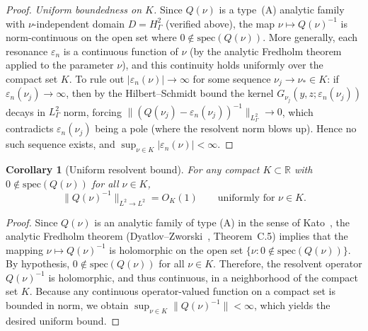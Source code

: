 \documentclass[12pt,a4paper]{amsart}
\newtheorem{corollary}[theorem]{Corollary}
\theoremstyle{remark}
\begin{document}
\begin{proof}
\emph{Uniform boundedness on $K$.}
Since $Q(\nu)$ is a type~(A) analytic family with $\nu$-independent domain
$D = H^2_\Gamma$ (verified above), the map
$\nu \mapsto Q(\nu)^{-1}$ is norm-continuous on the open set where
$0 \notin \mathrm{spec}(Q(\nu))$.
More generally, each resonance $\varepsilon_n$ is a continuous function
of $\nu$ (by the analytic Fredholm theorem applied to the parameter $\nu$),
and this continuity holds uniformly over the compact set $K$.
To rule out $|\varepsilon_n(\nu)| \to \infty$ for some sequence $\nu_j \to \nu_* \in K$:
if $\varepsilon_n(\nu_j) \to \infty$, then by the Hilbert--Schmidt bound the kernel
$G_{\nu_j}(y,z;\varepsilon_n(\nu_j))$ decays in $L^2_\Gamma$ norm,
forcing $\|(Q(\nu_j)-\varepsilon_n(\nu_j))^{-1}\|_{L^2_\Gamma} \to 0$,
which contradicts $\varepsilon_n(\nu_j)$ being a pole (where the resolvent norm blows up).
Hence no such sequence exists, and $\sup_{\nu\in K}|\varepsilon_n(\nu)| < \infty$.
\end{proof}

\begin{corollary}[Uniform resolvent bound]
\label{cor:Qnu_resolvent}
For any compact $K \subset \mathbb{R}$ with $0 \notin \mathrm{spec}(Q(\nu))$ for all $\nu \in K$,
\[
  \|Q(\nu)^{-1}\|_{L^2 \to L^2} = O_{K}(1)
  \qquad \text{uniformly for } \nu \in K.
\]
\end{corollary}

\begin{proof}
Since $Q(\nu)$ is an analytic family of type (A) in the sense of Kato~\cite{Kato66}, the analytic Fredholm theorem
(Dyatlov--Zworski~\cite{DZ19}, Theorem~C.5) implies that the mapping $\nu \mapsto Q(\nu)^{-1}$ is holomorphic
on the open set $\{\nu : 0 \notin \mathrm{spec}(Q(\nu))\}$. By hypothesis, $0 \notin \mathrm{spec}(Q(\nu))$
for all $\nu \in K$. Therefore, the resolvent operator $Q(\nu)^{-1}$ is holomorphic, and thus continuous,
in a neighborhood of the compact set $K$. Because any continuous operator-valued function on a compact set
is bounded in norm, we obtain $\sup_{\nu \in K} \|Q(\nu)^{-1}\| < \infty$, which yields the desired uniform bound.
\end{proof}
\end{document}
